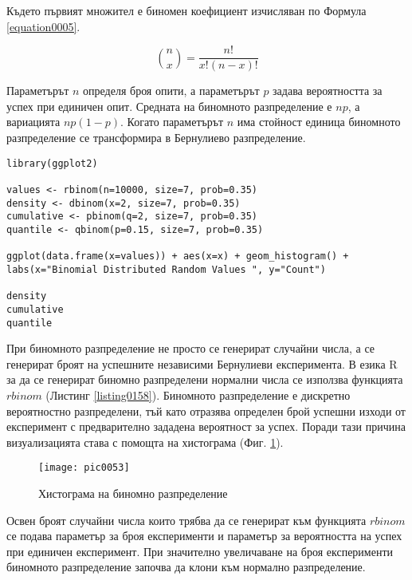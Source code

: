Където първият множител е биномен коефициент изчисляван по Формула \ref{equation0005}.

\begin{equation}
\binom{n}{x} = \frac{n!}{x!(n-x)!}
\label{equation0005}
\end{equation}

Параметърът $n$ определя броя опити, а параметърът $p$ задава вероятността за успех при единичен опит. Средната на биномното разпределение е $np$, а вариацията $np(1-p)$. Когато параметърът $n$ има стойност единица биномното разпределение се трансформира в Бернулиево разпределение. 

\begin{lstlisting}[caption=Биномно разпределение, label=listing0158]
library(ggplot2)

values <- rbinom(n=10000, size=7, prob=0.35)
density <- dbinom(x=2, size=7, prob=0.35)
cumulative <- pbinom(q=2, size=7, prob=0.35)
quantile <- qbinom(p=0.15, size=7, prob=0.35)

ggplot(data.frame(x=values)) + aes(x=x) + geom_histogram() + labs(x="Binomial Distributed Random Values ", y="Count")

density
cumulative
quantile
\end{lstlisting}

При биномното разпределение не просто се генерират случайни числа, а се генерират броят на успешните независими Бернулиеви експеримента. В езика R за да се генерират биномно разпределени нормални числа се използва функцията $rbinom$ (Листинг \ref{listing0158}). Биномното разпределение е дискретно вероятностно разпределени, тъй като отразява определен брой успешни изходи от експеримент с предварително зададена вероятност за успех. Поради тази причина визуализацията става с помощта на хистограма (Фиг. \ref{figure0053}).

\begin{figure}[h!]
  \centering
  \texttt{[image: pic0053]}
  \caption{Хистограма на биномно разпределение}
\label{figure0053}
\end{figure}
\FloatBarrier

Освен броят случайни числа които трябва да се генерират към функцията $rbinom$ се подава параметър за броя експерименти и параметър за вероятността на успех при единичен експеримент. При значително увеличаване на броя експерименти биномното разпределение започва да клони към нормално разпределение. 


